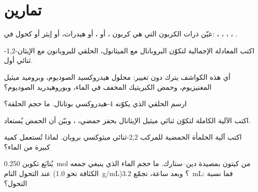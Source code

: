 \section{تمارين}

\begin{exercise}[$\star$]\label{exo:b1:acetals-protection:1}
عيّن ذرات الكربون التي هي كربون ، أو ، أو هيدرات، أو إيثر أو كحول في:
، ، ، ،
.
\end{exercise}

\begin{exercise}[$\star$]\label{exo:b1:acetals-protection:2}
اكتب المعادلة الإجمالية لتكوّن  البروبانال مع
الميثانول،  الحلقي للبروبانون مع الإيثان-1,2-ثنائي أول.
\end{exercise}

\begin{exercise}[$\star$]\label{exo:b1:acetals-protection:3}
أي هذه الكواشف يترك  دون تغيير: محلول هيدروكسيد
الصوديوم، وبروميد ميثيل المغنيزيوم، وحمض الكبريتيك المخفف في الماء، وبوروهيدريد
الصوديوم؟
\end{exercise}

\begin{exercise}[$\star$]\label{exo:b1:acetals-protection:4}
ارسم  الحلقي الذي يكوّنه 4-هيدروكسي بوتانال. ما حجم
الحلقة؟
\end{exercise}

\begin{exercise}[$\star\star$]\label{exo:b1:acetals-protection:5}
اكتب الآلية الكاملة لتكوّن ثنائي ميثيل  الإيثانال
بحفز حمضي، ، وبيّن أن الحمض
يُستعاد.
\end{exercise}

\begin{exercise}[$\star\star$]\label{exo:b1:acetals-protection:6}
اكتب آلية الحلمأة الحمضية للمركب
2,2-ثنائي ميثوكسي بروبان. لماذا تُستعمل كمية كبيرة من الماء؟
\end{exercise}

\begin{exercise}[$\star\star$]\label{exo:b1:acetals-protection:7}
يُتابَع تكوين  \qty{0.250}{mol} من كيتون بمصيدة
دين--ستارك. ما حجم الماء الذي ينبغي جمعه عند التحول
التام (الكثافة نحو \qty{1.0}{g/mL})؟ وبعد ساعة،
تجمّع \qty{3.2}{mL}: فما نسبة التحول؟
\end{exercise}

